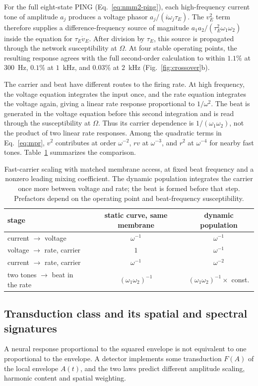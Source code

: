 \documentclass[11pt,a4paper]{article}
\begin{document}
For the full eight-state PING (Eq.~\eqref{eq:nmm2-ping}), each high-frequency current
tone of amplitude $a_j$ produces a voltage phasor $a_j/(i\omega_j\tau_E)$.
The $v_E^2$ term therefore supplies a difference-frequency source of magnitude
$a_1a_2/(\tau_E^2\omega_1\omega_2)$ inside the equation for $\tau_E\dot v_E$.
After division by $\tau_E$, this source is propagated through the network
susceptibility at $\Omega$. At four stable operating points, the resulting
response agrees with the full second-order calculation to within $1.1\%$ at
$300$~Hz, $0.1\%$ at $1$~kHz, and $0.03\%$ at $2$~kHz
(Fig.~\ref{fig:crossover}b).

The carrier and beat have different routes to the firing rate. At high frequency,
the voltage equation integrates the input once, and the rate equation integrates
the voltage again, giving a linear rate response proportional to $1/\omega^2$.
The beat is generated in the voltage equation before this second integration and
is read through the susceptibility at $\Omega$. Thus its carrier dependence is
$1/(\omega_1\omega_2)$, not the product of two linear rate responses. Among the
quadratic terms in Eq.~\eqref{eq:mpr}, $v^2$ contributes at order $\omega^{-2}$,
$rv$ at $\omega^{-3}$, and $r^2$ at $\omega^{-4}$ for nearby fast tones.
Table~\ref{tab:exponents} summarizes the comparison.

\begin{table}[h]
\centering\small
\begin{tabular}{lcc}
\toprule
stage & static curve, same membrane & dynamic population \\
\midrule
current $\to$ voltage & $\omega^{-1}$ & $\omega^{-1}$ \\
voltage $\to$ rate, carrier & $1$ & $\omega^{-1}$ \\
current $\to$ rate, carrier & $\omega^{-1}$ & $\omega^{-2}$ \\
two tones $\to$ beat in the rate & $(\omega_1\omega_2)^{-1}$ & $(\omega_1\omega_2)^{-1}\times$ const. \\
\bottomrule
\end{tabular}
\caption{Fast-carrier scaling with matched membrane access, at fixed beat frequency
and a nonzero leading mixing coefficient. The dynamic population integrates the
carrier once more between voltage and rate; the beat is formed before that step.
Prefactors depend on the operating point and beat-frequency susceptibility.}
\label{tab:exponents}
\end{table}

\subsection{Transduction class and its spatial and spectral signatures}\label{sec:transduction}
A neural response proportional to the squared envelope is not equivalent to one
proportional to the envelope. A detector implements some transduction $F(A)$ of the local
envelope $A(t)$, and the two laws predict different amplitude scaling, harmonic content and
spatial weighting.
\end{document}
